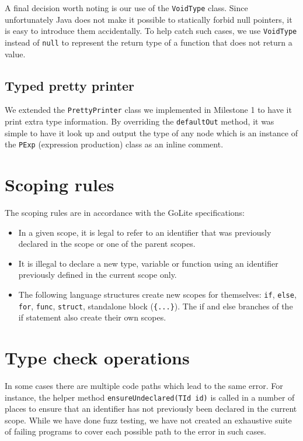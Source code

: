 \documentclass[oneside]{article}
\begin{document}
A final decision worth noting is our use of the \texttt{VoidType} class. Since unfortunately Java does not make it possible to statically forbid null pointers, it is easy to introduce them accidentally. To help catch such cases, we use \texttt{VoidType} instead of \texttt{null} to represent the return type of a function that does not return a value.

\subsection{Typed pretty printer}

We extended the \verb|PrettyPrinter| class we implemented in Milestone 1 to have it print extra type information. By overriding the \verb|defaultOut| method, it was simple to have it look up and output the type of any node which is an instance of the \verb|PExp| (expression production) class as an inline comment.

\section{Scoping rules}

The scoping rules are in accordance with the GoLite specifications:

\begin{itemize}
    \item In a given scope, it is legal to refer to an identifier that was previously declared in the scope or one of the parent scopes.
    \item It is illegal to declare a new type, variable or function using an identifier previously defined in the current scope only.
    \item The following language structures create new scopes for themselves: \texttt{if}, \texttt{else}, \texttt{for}, \texttt{func}, \texttt{struct}, standalone block (\verb|{...}|). The if and else branches of the if statement also create their own scopes.
\end{itemize}

\section{Type check operations}

In some cases there are multiple code paths which lead to the same error. For instance, the helper method \texttt{ensureUndeclared(TId id)} is called in a number of places to ensure that an identifier has not previously been declared in the current scope. While we have done fuzz testing, we have not created an exhaustive suite of failing programs to cover each possible path to the error in such cases.
\end{document}
